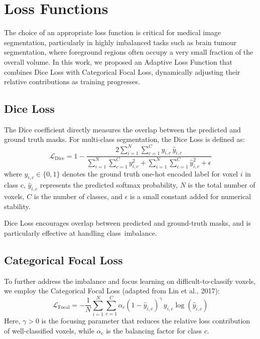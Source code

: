 \documentclass[a4paper,fleqn]{cas-dc}
\begin{document}

\section{Loss Functions}

The choice of an appropriate loss function is critical for medical image segmentation, particularly in highly imbalanced tasks such as brain tumour segmentation, where foreground regions often occupy a very small fraction of the overall volume. In this work, we proposed an Adaptive Loss Function that combines Dice Loss with Categorical Focal Loss, dynamically adjusting their relative contributions as training progresses.

\subsection{Dice Loss}

The Dice coefficient directly measures the overlap between the predicted and ground truth masks. For multi-class segmentation, the Dice Loss is defined as:
\begin{equation}
    \mathcal{L}_{\text{Dice}} = 1 -
    \frac{
        2 \sum_{i=1}^{N} \sum_{c=1}^{C} y_{i,c}\,\hat{y}_{i,c}
    }{
        \sum_{i=1}^{N} \sum_{c=1}^{C} y_{i,c}^{2}
        +
        \sum_{i=1}^{N} \sum_{c=1}^{C} \hat{y}_{i,c}^{2}
        +
        \epsilon
    }
    \label{Dice Loss}
\end{equation}
where $y_{i,c} \in \{0,1\}$ denotes the ground truth one-hot encoded label for voxel $i$ in class $c$, $\hat{y}_{i,c}$ represents the predicted softmax probability, $N$ is the total number of voxels, $C$ is the number of classes, and $\epsilon$ is a small constant added for numerical stability.

Dice Loss encourages overlap between predicted and ground-truth masks, and is particularly effective at handling class~imbalance.

\subsection{Categorical Focal Loss}

To further address the imbalance and focus learning on difficult-to-classify voxels, we employ the Categorical Focal Loss (adapted from Lin et al., 2017):
\begin{equation}
    \mathcal{L}_{\text{Focal}} = - \frac{1}{N}
    \sum_{i=1}^{N} \sum_{c=1}^{C}
    \alpha_c \left(1 - \hat{y}_{i,c}\right)^{\gamma}
    \, y_{i,c} \log\left(\hat{y}_{i,c}\right)
\end{equation}
Here, $\gamma > 0$ is the focusing parameter that reduces the relative loss contribution of well-classified voxels, while $\alpha_c$ is the balancing factor for class $c$.
\end{document}
